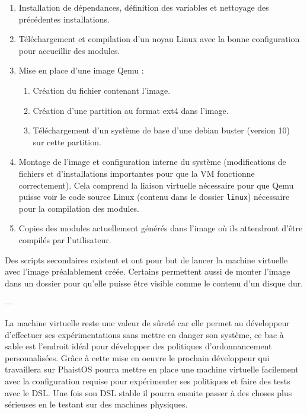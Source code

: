 \begin{enumerate}
    \item Installation de dépendances, définition des variables et nettoyage 
    des précédentes installations.
    \item Téléchargement et compilation d'un noyau Linux avec la bonne 
    configuration pour accueillir des modules.
    \item Mise en place d'une image Qemu :
    \begin{enumerate}
        \item Création du fichier contenant l'image.
        \item Création d'une partition au format ext4 dans l'image.
        \item Téléchargement d'un système de base d'une debian buster (version 
        10) sur cette partition.
    \end{enumerate}
    \item Montage de l'image et configuration interne du système (modifications 
    de fichiers et d'installations importantes pour que la VM fonctionne 
    correctement). Cela comprend la liaison virtuelle nécessaire pour que Qemu 
    puisse voir le code source Linux (contenu dans le dossier \texttt{linux}) 
    nécessaire pour la compilation des modules.
    \item Copies des modules actuellement générés dans l'image où ils 
    attendront d'être compilés par l'utilisateur.
\end{enumerate}

Des scripts secondaires existent et ont pour but de lancer la machine virtuelle 
avec l'image préalablement créée. Certains permettent aussi de monter l'image 
dans un dossier pour qu'elle puisse être visible comme le contenu d'un disque 
dur.

\begin{center}
---
\end{center}
    
La machine virtuelle reste une valeur de sûreté car elle permet au développeur 
d'effectuer ses expérimentations sans mettre en danger son système, ce bac à 
sable est l'endroit idéal pour développer des politiques d'ordonnancement 
personnalisées. Grâce à cette mise en oeuvre le prochain développeur qui 
travaillera sur PhaistOS pourra mettre en place une machine virtuelle 
facilement avec la configuration requise pour expérimenter ses politiques et 
faire des tests avec le DSL. Une fois son DSL stable il pourra ensuite passer à 
des choses plus sérieuses en le testant sur des machines physiques.

